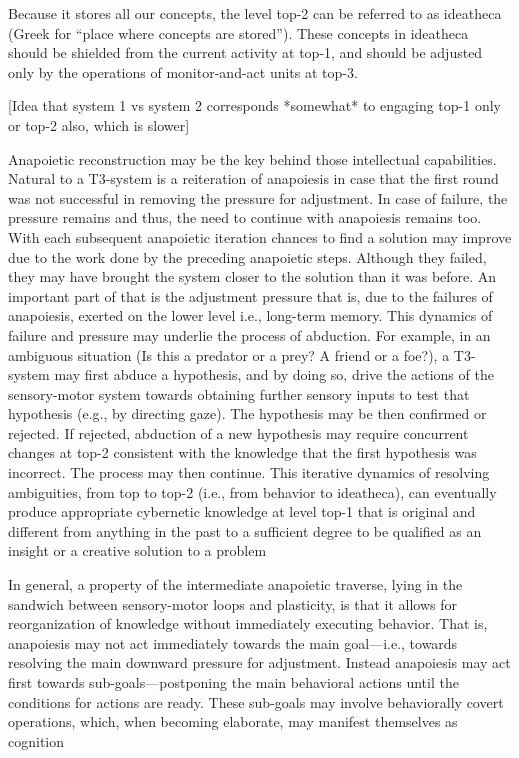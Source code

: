 \documentclass[10pt,a4paper]{article}
\begin{document}
Because it stores all our concepts, the level top-2 can be
referred to as ideatheca (Greek for “place where concepts are
stored”). These concepts in ideatheca should be shielded from the
current activity at top-1, and should be adjusted only by the
operations of monitor-and-act units at top-3.

[Idea that system 1 vs system 2 corresponds *somewhat* to engaging top-1 only or top-2 also, which is slower]


Anapoietic reconstruction may be the
key behind those intellectual capabilities. Natural to a T3-system is
a reiteration of anapoiesis in case that the first round was not
successful in removing the pressure for adjustment. In case of
failure, the pressure remains and thus, the need to continue with
anapoiesis remains too. With each subsequent anapoietic iteration
chances to find a solution may improve due to the work done by
the preceding anapoietic steps. Although they failed, they may
have brought the system closer to the solution than it was before.
An important part of that is the adjustment pressure that is, due to
the failures of anapoiesis, exerted on the lower level i.e., long-term
memory.
This dynamics of failure and pressure may underlie the process
of abduction. For example, in an ambiguous situation (Is this a
predator or a prey? A friend or a foe?), a T3-system may first
abduce a hypothesis, and by doing so, drive the actions of the
sensory-motor system towards obtaining further sensory inputs to
test that hypothesis (e.g., by directing gaze). The hypothesis may
be then confirmed or rejected. If rejected, abduction of a new
hypothesis may require concurrent changes at top-2 consistent
with the knowledge that the first hypothesis was incorrect. The
process may then continue. This iterative dynamics of resolving
ambiguities, from top to top-2 (i.e., from behavior to ideatheca),
can eventually produce appropriate cybernetic knowledge at level
top-1 that is original and different from anything in the past to a
sufficient degree to be qualified as an insight or a creative solution
to a problem



In general, a property of the intermediate anapoietic traverse,
lying in the sandwich between sensory-motor loops and plasticity,
is that it allows for reorganization of knowledge without immediately
executing behavior. That is, anapoiesis may not act immediately
towards the main goal—i.e., towards resolving the main
downward pressure for adjustment. Instead anapoiesis may act
first towards sub-goals—postponing the main behavioral actions
until the conditions for actions are ready. These sub-goals may
involve behaviorally covert operations, which, when becoming
elaborate, may manifest themselves as cognition
\end{document}
